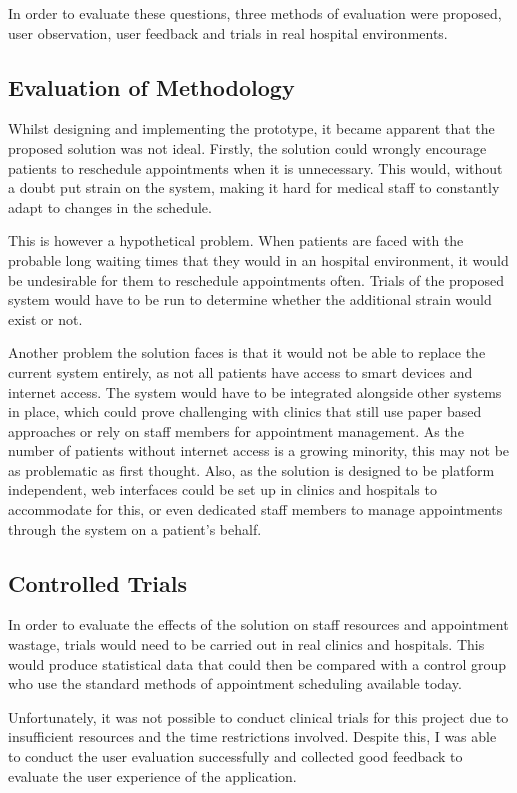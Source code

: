 In order to evaluate these questions, three methods of evaluation were proposed, user observation, user feedback and trials in real hospital environments.

\subsection{Evaluation of Methodology}

Whilst designing and implementing the prototype, it became apparent that the proposed solution was not ideal. Firstly, the solution could wrongly encourage patients to reschedule appointments when it is unnecessary. This would, without a doubt put strain on the system, making it hard for medical staff to constantly adapt to changes in the schedule.

This is however a hypothetical problem. When patients are faced with the probable long waiting times that they would in an hospital environment, it would be undesirable for them to reschedule appointments often. Trials of the proposed system would have to be run to determine whether the additional strain would exist or not.

Another problem the solution faces is that it would not be able to replace the current system entirely, as not all patients have access to smart devices and internet access. The system would have to be integrated alongside other systems in place, which could prove challenging with clinics that still use paper based approaches or rely on staff members for appointment management. As the number of patients without internet access is a growing minority, this may not be as problematic as first thought. Also, as the solution is designed to be platform independent, web interfaces could be set up in clinics and hospitals to accommodate for this, or even dedicated staff members to manage appointments through the system on a patient's behalf.

\subsection{Controlled Trials}

In order to evaluate the effects of the solution on staff resources and appointment wastage, trials would need to be carried out in real clinics and hospitals. This would produce statistical data that could then be compared with a control group who use the standard methods of appointment scheduling available today.

Unfortunately, it was not possible to conduct clinical trials for this project due to insufficient resources and the time restrictions involved. Despite this, I was able to conduct the user evaluation successfully and collected good feedback to evaluate the user experience of the application.


